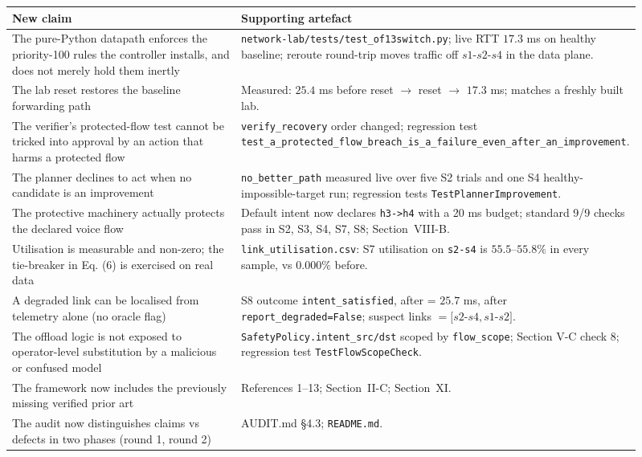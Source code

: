 \documentclass[11pt,a4paper]{article}
\begin{document}
\begin{longtable}{@{}p{0.44\linewidth}p{0.47\linewidth}@{}}
\textbf{New claim} & \textbf{Supporting artefact} \\
\midrule
The pure-Python datapath enforces the priority-100 rules the controller
installs, and does not merely hold them inertly &
\texttt{network-lab/tests/test\_of13switch.py}; live RTT $17.3$ ms on healthy
baseline; reroute round-trip moves
traffic off $s1$-$s2$-$s4$ in the data plane. \\
The lab reset restores the baseline forwarding path & Measured: $25.4$ ms
before reset $\to$ reset $\to$ $17.3$ ms; matches a freshly built lab. \\
The verifier's protected-flow test cannot be tricked into approval by an
action that harms a protected flow & \texttt{verify\_recovery} order changed;
regression test
\texttt{test\_a\_protected\_flow\_breach\_is\_a\_failure\_even\_after\_an\_improvement}. \\
The planner declines to act when no candidate is an improvement &
\texttt{no\_better\_path} measured live over five S2 trials and one S4
healthy-impossible-target run; regression tests
\texttt{TestPlannerImprovement}. \\
The protective machinery actually protects the declared voice flow & Default
intent now declares \texttt{h3->h4} with a 20 ms budget; standard 9/9 checks
pass in S2, S3, S4, S7, S8; Section~VIII-B. \\
Utilisation is measurable and non-zero; the tie-breaker in Eq. (6) is
exercised on real data & \texttt{link\_utilisation.csv}: S7 utilisation on
\texttt{s2-s4} is $55.5$--$55.8\%$ in every sample, vs $0.000\%$ before. \\
A degraded link can be localised from telemetry alone (no oracle flag) & S8
outcome \texttt{intent\_satisfied}, after = $25.7$ ms, after
\texttt{report\_degraded=False}; suspect links $=[s2$-$s4, s1$-$s2]$. \\
The offload logic is not exposed to operator-level substitution by a
malicious or confused model & \texttt{SafetyPolicy.intent\_src/dst} scoped by
\texttt{flow\_scope}; Section V-C check 8; regression test
\texttt{TestFlowScopeCheck}. \\
The framework now includes the previously missing verified prior art &
References 1--13; Section~II-C; Section~XI. \\
The audit now distinguishes claims vs defects in two phases (round 1, round 2) &
AUDIT.md §4.3; \texttt{README.md}. \\
\bottomrule
\end{longtable}
\end{document}
